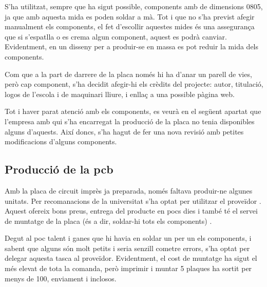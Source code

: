S'ha utilitzat,
sempre que ha sigut possible, components amb  de dimensions 0805,
ja que amb aquesta mida es poden soldar a mà. Tot i que no s'ha previst afegir
manualment els components, el fet d'escollir aquestes mides és una assegurança
que si s'espatlla o es crema algun component, aquest es podrà canviar.
Evidentment, en un disseny per a produir-se en massa es pot reduir la mida dels
components.

Com que a la part de darrere de la placa només hi ha d'anar un parell de vies,
però cap component, s'ha decidit afegir-hi els crèdits del projecte: autor,
titulació, logos de l'escola i de maquinari lliure, i enllaç a una possible
pàgina web.

Tot i haver parat atenció amb els components, es veurà en el següent apartat que
l'empresa amb qui s'ha encarregat la producció de la placa no tenia disponibles
alguns d'aquests. Així doncs, s'ha hagut de fer una nova revisió amb petites
modificacions d'alguns components.

\subsection{Producció de la pcb}

Amb la placa de circuit imprès ja preparada, només faltava produir-ne algunes
unitats. Per recomanacions de la universitat s'ha optat per utilitzar el
proveïdor . Aquest ofereix bons preus, entrega del producte en pocs
dies i també té el servei de muntatge de la placa (és a dir, soldar-hi tots els
components) \cite{JlcPcb}.

Degut al poc talent i ganes que hi havia en soldar un per un els components, i
sabent que alguns són molt petits i seria senzill cometre errors, s'ha optat
per delegar aquesta tasca al proveïdor. Evidentment, el cost de muntatge ha
sigut el més elevat de tota la comanda, però imprimir i muntar 5 plaques
ha sortit per menys de \SI[round-mode=places,round-precision=0]{100}{\EUR},
enviament i  inclosos.

